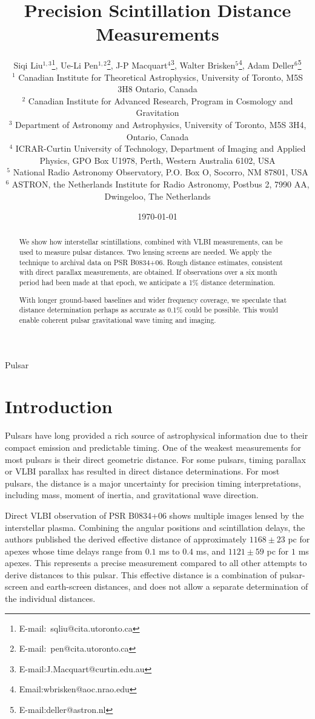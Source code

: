 \documentclass[useAMS,usenatbib]{mn2e}
\title[Lensing Distance]{
Precision Scintillation Distance Measurements
}
\author[Liu et al]{Siqi Liu$^{1,3}$\thanks{E-mail:\ sqliu@cita.utoronto.ca}, Ue-Li
  Pen$^{1,2}$\thanks{E-mail:\ pen@cita.utoronto.ca}, J-P Macquart$^{4}$\thanks{E-mail:J.Macquart@curtin.edu.au},
  Walter Brisken$^{5}$\thanks{Email:wbrisken@aoc.nrao.edu}, Adam Deller$^{6}$\thanks{E-mail:deller@astron.nl}\\
 $^1$ Canadian Institute for Theoretical Astrophysics, University of Toronto, M5S 3H8 Ontario, Canada \\
$^2$ Canadian Institute for Advanced Research, Program in Cosmology
and Gravitation\\
$^3$ Department of Astronomy and Astrophysics, University of Toronto, M5S 3H4, Ontario, Canada\\
$^4$ ICRAR-Curtin University of Technology, Department of Imaging and Applied Physics, GPO Box U1978, Perth, Western Australia 6102, USA \\
$^5$ National Radio Astronomy Observatory, P.O. Box O, Socorro, NM 87801, USA\\
$^6$ ASTRON, the Netherlands Institute for Radio Astronomy, Postbus 2, 7990 AA, Dwingeloo, The Netherlands\\
}
\begin{document}
\date{\today}

\pagerange{\pageref{firstpage}--\pageref{lastpage}} 

\maketitle
\label{firstpage}
\begin{abstract}
We show how interstellar scintillations, combined with VLBI
measurements, can be used to measure pulsar distances.  Two lensing
screens are needed.  We apply the technique to archival data on PSR
B0834+06.  Rough distance estimates, consistent with direct parallax
measurements, are obtained.  If observations over a six month period
had been made at that epoch, we anticipate a 1\% distance
determination.   

With longer ground-based baselines and wider frequency coverage, we
speculate that distance determination perhaps as accurate as 0.1\%
could be possible. This would enable coherent pulsar gravitational
wave timing and imaging.
\end{abstract}
\begin{keywords}
Pulsar
\end{keywords}

\newcommand{\be}{\begin{eqnarray}}
\newcommand{\ee}{\end{eqnarray}}
\newcommand{\beq}{\begin{equation}}
\newcommand{\eeq}{\end{equation}}

\section{Introduction}

Pulsars have long provided a rich source of astrophysical information
due to their compact emission and predictable timing.   One of the
weakest measurements for most pulsars is their direct geometric
distance.  For some pulsars, timing parallax or VLBI parallax has
resulted in direct distance determinations.  For most pulsars, the
distance is a major uncertainty for precision timing interpretations,
including mass, moment of inertia, and gravitational wave
direction\citep{boyle2012}.

Direct VLBI observation of PSR B0834+06 shows multiple images lensed
by the interstellar plasma.  Combining the angular positions and
scintillation delays, the authors published the derived effective
distance \citep{2010ApJ...708..232B} of approximately $1168\pm 23$ pc for apexes whose time delays range from $0.1$ ms to $0.4$ ms, and $1121\pm 59$ pc for $1$ ms apexes.
This represents a precise measurement compared to all other attempts
to derive distances to this pulsar.  This effective distance is a
combination of pulsar-screen and earth-screen distances, and does not
allow a separate determination of the individual distances.
\end{document}
